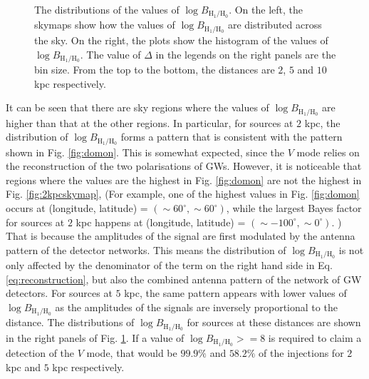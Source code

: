 \documentclass[aps,twocolumn,showpacs,groupedaddress, nofootinbib]{revtex4}  %
\begin{document}
\begin{figure}
\begin{center}
{        }\quad
    \end{center}
    \caption{The distributions of the values of $\log B_{\text{H}_1 / \text{H}_0}$.
    On the left, the skymaps show how the values of $\log B_{\text{H}_1 / \text{H}_0}$ are distributed across the sky.
    On the right, the plots show the histogram of the values of $\log B_{\text{H}_1 / \text{H}_0}$.
    The value of $\Delta$ in the legends on the right panels are the bin size. 
    From the top to the bottom, the distances are $2$, $5$ and $10$ kpc respectively.
    \label{fig:simulationresults}} 
\end{figure}
It can be seen that there are sky regions where the values of $\log B_{\text{H}_1 / \text{H}_0}$ 
are higher than that at the other regions.
In particular, for sources at $2$ kpc, the distribution of  $\log B_{\text{H}_1 / \text{H}_0}$ forms a pattern that 
is consistent with the pattern shown in Fig. \ref{fig:domon}. This is somewhat expected, 
since the $V$ mode relies on the reconstruction of the two polarisations of \acp{GW}.
However, it is noticeable that regions where the values are the highest in Fig. \ref{fig:domon} are not the highest in Fig. \ref{fig:2kpcskymap},
(For example, one of the highest values in Fig. \ref{fig:domon} occurs at (longitude, latitude) = $(\sim 60^\circ, \sim 60^\circ)$, 
while the largest Bayes factor
for sources at $2$ kpc happens at (longitude, latitude) = $(\sim -100^\circ, \sim 0^\circ)$. )
That is because the amplitudes of the signal are first modulated by the antenna pattern of the detector networks.
This means the distribution of $\log B_{\text{H}_1 / \text{H}_0}$ 
is not only affected by the denominator of the term on the right hand side in Eq. \ref{eq:reconstruction},
but also the combined antenna pattern of the network of \ac{GW} detectors.
For sources at $5$ kpc, the same pattern appears 
with lower values of $\log B_{\text{H}_1 / \text{H}_0}$ as the amplitudes of the signals are inversely proportional to the distance.
The distributions of $\log B_{\text{H}_1 / \text{H}_0}$ for sources at these distances are shown in the right panels of Fig. \ref{fig:simulationresults}.
If a value of $\log B_{\text{H}_1 / \text{H}_0} >= 8$ is required to claim a detection of the $V$ mode, that would be $99.9\%$ and $58.2\%$ of the injections 
for $2$kpc and $5$ kpc respectively.
\end{document}
